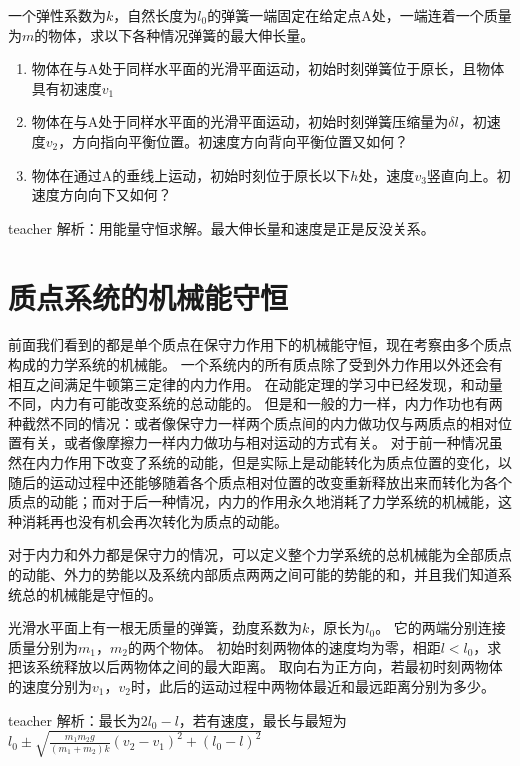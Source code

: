 \begin{example}
一个弹性系数为$k$，自然长度为$l_0$的弹簧一端固定在给定点A处，一端连着一个质量为$m$的物体，求以下各种情况弹簧的最大伸长量。
\begin{enumerate}
\item
物体在与A处于同样水平面的光滑平面运动，初始时刻弹簧位于原长，且物体具有初速度$v_1$
\item 物体在与A处于同样水平面的光滑平面运动，初始时刻弹簧压缩量为$\delta l$，初速度$v_2$，方向指向平衡位置。初速度方向背向平衡位置又如何？
\item 物体在通过A的垂线上运动，初始时刻位于原长以下$h$处，速度$v_3$竖直向上。初速度方向向下又如何？
\end{enumerate}
	\begin{taggedblock}{teacher}
		\noindent
		解析：用能量守恒求解。最大伸长量和速度是正是反没关系。
	\end{taggedblock}
\end{example}

\section{质点系统的机械能守恒}
前面我们看到的都是单个质点在保守力作用下的机械能守恒，现在考察由多个质点构成的力学系统的机械能。
一个系统内的所有质点除了受到外力作用以外还会有相互之间满足牛顿第三定律的内力作用。
在动能定理的学习中已经发现，和动量不同，内力有可能改变系统的总动能的。
但是和一般的力一样，内力作功也有两种截然不同的情况：或者像保守力一样两个质点间的内力做功仅与两质点的相对位置有关，或者像摩擦力一样内力做功与相对运动的方式有关。
对于前一种情况虽然在内力作用下改变了系统的动能，但是实际上是动能转化为质点位置的变化，以随后的运动过程中还能够随着各个质点相对位置的改变重新释放出来而转化为各个质点的动能；而对于后一种情况，内力的作用永久地消耗了力学系统的机械能，这种消耗再也没有机会再次转化为质点的动能。

对于内力和外力都是保守力的情况，可以定义整个力学系统的总机械能为全部质点的动能、外力的势能以及系统内部质点两两之间可能的势能的和，并且我们知道系统总的机械能是守恒的。

\begin{example}
光滑水平面上有一根无质量的弹簧，劲度系数为$k$，原长为$l_0$。
它的两端分别连接质量分别为$m_1$，$m_2$的两个物体。
初始时刻两物体的速度均为零，相距$l<l_0$，求把该系统释放以后两物体之间的最大距离。
取向右为正方向，若最初时刻两物体的速度分别为$v_1$，$v_2$时，此后的运动过程中两物体最近和最远距离分别为多少。
	\begin{taggedblock}{teacher}
		\newline
		解析：最长为$2l_0-l$，若有速度，最长与最短为$l_0\pm\sqrt{\frac{m_1m_2g}{(m_1+m_2)k}(v_2-v_1)^2+(l_0-l)^2}$
	\end{taggedblock}
\end{example}


